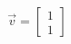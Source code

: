 \documentclass[preview]{standalone}
\begin{document}
\begin{align*}
\vec{v} = \begin{bmatrix} 1 \\ 1 \end{bmatrix}
\end{align*}
\end{document}
